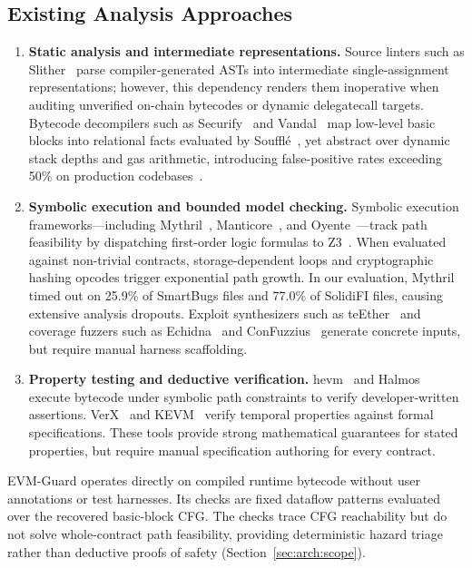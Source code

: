 \documentclass[pdflatex,sn-mathphys]{sn-jnl}
\theoremstyle{thmstyleone}
\theoremstyle{thmstyletwo}
\begin{document}
\subsection{Existing Analysis Approaches}\label{sec:intro:approaches}
\begin{enumerate}
    \item \textbf{Static analysis and intermediate representations.} Source linters such as Slither~\cite{feist2019slither} parse compiler-generated ASTs into intermediate single-assignment representations; however, this dependency renders them inoperative when auditing unverified on-chain bytecodes or dynamic delegatecall targets. Bytecode decompilers such as Securify~\cite{tsankov2018securify} and Vandal~\cite{brent2018vandal} map low-level basic blocks into relational facts evaluated by Souffl{\'e}~\cite{scholz2016souffle}, yet abstract over dynamic stack depths and gas arithmetic, introducing false-positive rates exceeding 50\% on production codebases~\cite{durieux2020empirical,ghaleb2020how}.
    \item \textbf{Symbolic execution and bounded model checking.} Symbolic execution frameworks—including Mythril~\cite{mueller2018mythril}, Manticore~\cite{mossberg2019manticore}, and Oyente~\cite{luu2016making}—track path feasibility by dispatching first-order logic formulas to Z3~\cite{de2008z3}. When evaluated against non-trivial contracts, storage-dependent loops and cryptographic hashing opcodes trigger exponential path growth. In our evaluation, Mythril timed out on 25.9\% of SmartBugs files and 77.0\% of SolidiFI files, causing extensive analysis dropouts. Exploit synthesizers such as teEther~\cite{krupp2018teether} and coverage fuzzers such as Echidna~\cite{grieco2020echidna} and ConFuzzius~\cite{torres2021confuzzius} generate concrete inputs, but require manual harness scaffolding.
    \item \textbf{Property testing and deductive verification.} hevm~\cite{dxo2024hevm} and Halmos~\cite{a16z2023halmos} execute bytecode under symbolic path constraints to verify developer-written assertions. VerX~\cite{permenev2020verx} and KEVM~\cite{hildenbrandt2018kevm} verify temporal properties against formal specifications. These tools provide strong mathematical guarantees for stated properties, but require manual specification authoring for every contract.
\end{enumerate}
EVM-Guard operates directly on compiled runtime bytecode without user annotations or test harnesses. Its checks are fixed dataflow patterns evaluated over the recovered basic-block CFG. The checks trace CFG reachability but do not solve whole-contract path feasibility, providing deterministic hazard triage rather than deductive proofs of safety (Section~\ref{sec:arch:scope}).
\end{document}
